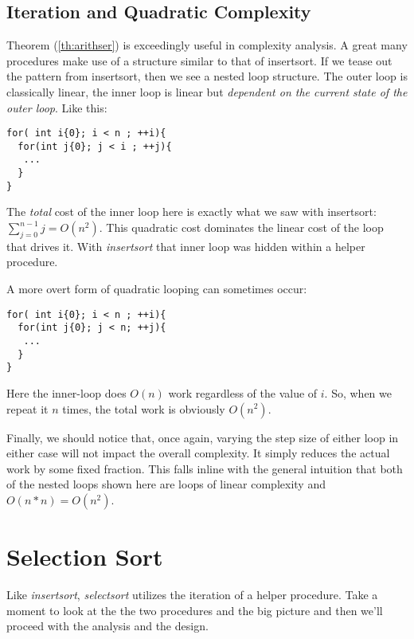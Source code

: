 \documentclass[]{tufte-handout}
\begin{document}
\subsection{Iteration and Quadratic Complexity}

Theorem (\ref{th:arithser}) is exceedingly useful in complexity analysis. A great many procedures make use of a structure similar to that of insertsort. If we tease out the pattern from insertsort, then we see a nested loop structure. The outer loop is classically linear, the inner loop is linear but \textit{dependent on the current state of the outer loop}. Like this:
\begin{verbatim}
for( int i{0}; i < n ; ++i){
  for(int j{0}; j < i ; ++j){
   ...
  }
}
\end{verbatim}

The \textit{total} cost of the inner loop here is exactly what we saw with insertsort: $\sum\limits_{j=0}^{n-1} j = O(n^2)$. This quadratic cost dominates the linear cost of the loop that drives it. With \textit{insertsort} that inner loop was hidden within a helper procedure. 

A more overt form of quadratic looping can sometimes occur:
\begin{verbatim}
for( int i{0}; i < n ; ++i){
  for(int j{0}; j < n; ++j){
   ...
  }
}
\end{verbatim}
Here the inner-loop does $O(n)$ work regardless of the value of $i$. So, when we repeat it $n$ times, the total work is obviously $O(n^2)$. 

Finally, we should notice that, once again, varying the step size of either loop in either case will not impact the overall complexity. It simply reduces the actual work by some fixed fraction. This falls inline with the general intuition that both of the nested loops shown here are loops of linear complexity and $O(n*n)=O(n^2)$.

\section{Selection Sort}

Like \textit{insertsort}, \textit{selectsort} utilizes the iteration of a helper procedure. Take a moment to look at the the two procedures and the big picture and then we'll proceed with the analysis and the design.
 
\end{document}
